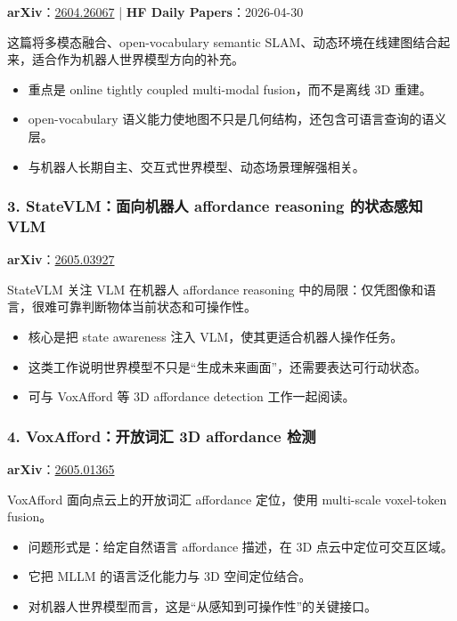 \textbf{arXiv}：\href{https://arxiv.org/abs/2604.26067}{2604.26067} | \textbf{HF Daily Papers}：2026-04-30

这篇将多模态融合、open-vocabulary semantic SLAM、动态环境在线建图结合起来，适合作为机器人世界模型方向的补充。

\begin{itemize}[leftmargin=1.5em]
  \item 重点是 online tightly coupled multi-modal fusion，而不是离线 3D 重建。
  \item open-vocabulary 语义能力使地图不只是几何结构，还包含可语言查询的语义层。
  \item 与机器人长期自主、交互式世界模型、动态场景理解强相关。
\end{itemize}

\subsubsection{3. StateVLM：面向机器人 affordance reasoning 的状态感知 VLM}

\textbf{arXiv}：\href{https://arxiv.org/abs/2605.03927}{2605.03927}

StateVLM 关注 VLM 在机器人 affordance reasoning 中的局限：仅凭图像和语言，很难可靠判断物体当前状态和可操作性。

\begin{itemize}[leftmargin=1.5em]
  \item 核心是把 state awareness 注入 VLM，使其更适合机器人操作任务。
  \item 这类工作说明世界模型不只是“生成未来画面”，还需要表达可行动状态。
  \item 可与 VoxAfford 等 3D affordance detection 工作一起阅读。
\end{itemize}

\subsubsection{4. VoxAfford：开放词汇 3D affordance 检测}

\textbf{arXiv}：\href{https://arxiv.org/abs/2605.01365}{2605.01365}

VoxAfford 面向点云上的开放词汇 affordance 定位，使用 multi-scale voxel-token fusion。

\begin{itemize}[leftmargin=1.5em]
  \item 问题形式是：给定自然语言 affordance 描述，在 3D 点云中定位可交互区域。
  \item 它把 MLLM 的语言泛化能力与 3D 空间定位结合。
  \item 对机器人世界模型而言，这是“从感知到可操作性”的关键接口。
\end{itemize}

